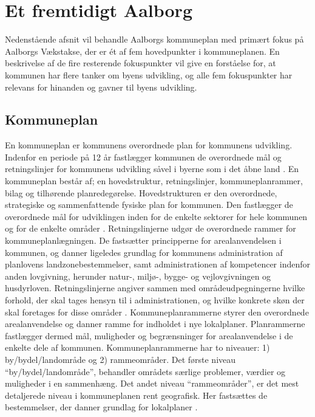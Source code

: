 \chapter{Et fremtidigt Aalborg}
Nedenstående afsnit vil behandle Aalborgs kommuneplan med primært fokus på Aalborgs Vækstakse, der er ét af fem hovedpunkter i kommuneplanen. En beskrivelse af de fire resterende fokuspunkter vil give en forståelse for, at kommunen har flere tanker om byens udvikling, og alle fem fokuspunkter har relevans for hinanden og gavner til byens udvikling.

\section{Kommuneplan}
En kommuneplan er kommunens overordnede plan for kommunens udvikling. Indenfor en periode på 12 år fastlægger kommunen de overordnede mål og retningslinjer for kommunens udvikling såvel i byerne som i det åbne land \citep{kommuneplan1}. 
\newline
\newline
En kommuneplan består af; en hovedstruktur, retningslinjer, kommuneplanrammer, bilag og tilhørende planredegørelse. 
\newline \indent{     }  Hovedstrukturen er den overordnede, strategiske og sammenfattende fysiske plan for kommunen. Den fastlægger de overordnede mål for udviklingen inden for de enkelte sektorer for hele kommunen og for de enkelte områder \citep{kommuneplan1}.
\newline \indent{     }  Retningslinjerne udgør de overordnede rammer for kommuneplanlægningen. De fastsætter principperne for arealanvendelsen i kommunen, og danner ligeledes grundlag for kommunens administration af planlovens landzonebestemmelser, samt administrationen af kompetencer indenfor anden lovgivning, herunder natur-, miljø-, bygge- og vejlovgivningen og husdyrloven. Retningslinjerne angiver sammen med områdeudpegningerne hvilke forhold, der skal tages hensyn til i administrationen, og hvilke konkrete skøn der skal foretages for disse områder \citep{retningslinjer}. 
\newline \indent{     }  Kommuneplanrammerne styrer den overordnede arealanvendelse og danner ramme for indholdet i nye lokalplaner. Planrammerne fastlægger dermed mål, muligheder og begrænsninger for arealanvendelse i de enkelte dele af kommunen. Kommuneplanrammerne har to niveauer: 1) by/bydel/landområde og 2) rammeområder. Det første niveau “by/bydel/landområde”, behandler områdets særlige problemer, værdier og muligheder i en sammenhæng. Det andet niveau “rammeområder”, er det mest detaljerede niveau i kommuneplanen rent geografisk. Her fastsættes de bestemmelser, der danner grundlag for lokalplaner \citep{rammer}. 
